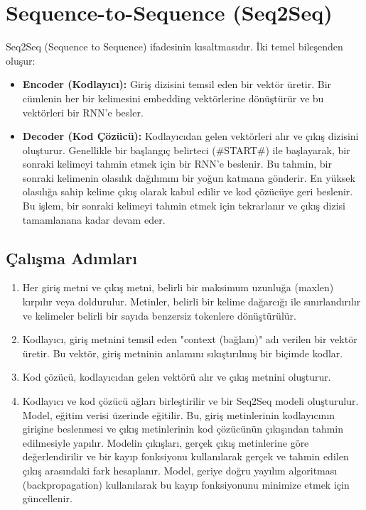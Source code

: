 \section{Sequence-to-Sequence (Seq2Seq)}
Seq2Seq (Sequence to Sequence) ifadesinin kısaltmasıdır. İki temel bileşenden oluşur:
\begin{itemize}
    \item \textbf{Encoder (Kodlayıcı):} Giriş dizisini temsil eden bir vektör üretir. Bir cümlenin her bir kelimesini embedding vektörlerine dönüştürür ve bu vektörleri bir RNN'e besler.
    \item \textbf{Decoder (Kod Çözücü):} Kodlayıcıdan gelen vektörleri alır ve çıkış dizisini oluşturur. Genellikle bir başlangıç belirteci (\#START\#) ile başlayarak, bir sonraki kelimeyi tahmin etmek için bir RNN'e beslenir. Bu tahmin, bir sonraki kelimenin olasılık dağılımını bir yoğun katmana gönderir. En yüksek olasılığa sahip kelime çıkış olarak kabul edilir ve kod çözücüye geri beslenir. Bu işlem, bir sonraki kelimeyi tahmin etmek için tekrarlanır ve çıkış dizisi tamamlanana kadar devam eder.
\end{itemize}

\subsection{Çalışma Adımları}
\begin{enumerate}
    \item Her giriş metni ve çıkış metni, belirli bir maksimum uzunluğa (maxlen) kırpılır veya doldurulur. Metinler, belirli bir kelime dağarcığı ile sınırlandırılır ve kelimeler belirli bir sayıda benzersiz tokenlere dönüştürülür.
    \item  Kodlayıcı, giriş metnini temsil eden "context (bağlam)" adı verilen bir vektör üretir. Bu vektör, giriş metninin anlamını sıkıştırılmış bir biçimde kodlar.
    \item Kod çözücü, kodlayıcıdan gelen vektörü alır ve çıkış metnini oluşturur.
    \item Kodlayıcı ve kod çözücü ağları birleştirilir ve bir Seq2Seq modeli oluşturulur. Model, eğitim verisi üzerinde eğitilir. Bu, giriş metinlerinin kodlayıcının girişine beslenmesi ve çıkış metinlerinin kod çözücünün çıkışından tahmin edilmesiyle yapılır. Modelin çıkışları, gerçek çıkış metinlerine göre değerlendirilir ve bir kayıp fonksiyonu kullanılarak gerçek ve tahmin edilen çıkış arasındaki fark hesaplanır. Model, geriye doğru yayılım algoritması (backpropagation) kullanılarak bu kayıp fonksiyonunu minimize etmek için güncellenir.
\end{enumerate}

